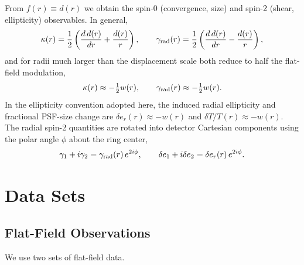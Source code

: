 From $f(r)\equiv d(r)$ we obtain the spin-0 (convergence, size) and spin-2 (shear, ellipticity) observables. In general,
%
\begin{equation}
\kappa(r) = \frac{1}{2}\left(\frac{d\,d(r)}{dr} + \frac{d(r)}{r}\right), \qquad
\gamma_{\rm rad}(r) = \frac{1}{2}\left(\frac{d\,d(r)}{dr} - \frac{d(r)}{r}\right),
\end{equation}
%
and for radii much larger than the displacement scale both reduce to half the flat-field modulation,
%
\begin{equation}
\kappa(r) \approx -\tfrac{1}{2} w(r), \qquad \gamma_{\rm rad}(r) \approx -\tfrac{1}{2} w(r).
\label{eq:kappa_gamma}
\end{equation}
%
In the ellipticity convention adopted here, the induced radial ellipticity and fractional PSF-size change are $\delta e_r(r) \approx -w(r)$ and $\delta T/T(r) \approx -w(r)$. The radial spin-2 quantities are rotated into detector Cartesian components using the polar angle $\phi$ about the ring center,
%
\begin{equation}
\gamma_1 + i\gamma_2 = \gamma_{\rm rad}(r)\,e^{2i\phi}, \qquad
\delta e_1 + i\delta e_2 = \delta e_r(r)\,e^{2i\phi}.
\label{eq:spin2}
\end{equation}


\section{Data Sets} \label{sec:data}

\subsection{Flat-Field Observations}

We use two sets of flat-field data.

